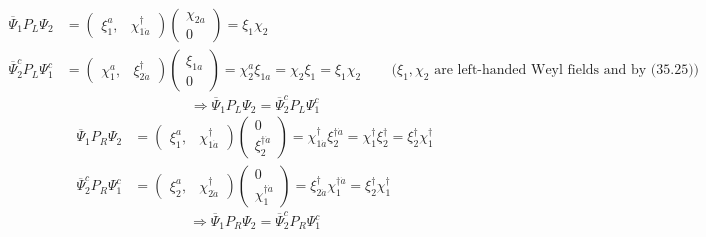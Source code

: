 \documentclass[twoside]{amsart}
\begin{document}
\begin{itemize}
$
\begin{aligned}
  \overline{\Psi}_1 P_L \Psi_2 & = ( \begin{matrix} \xi_1^a , & \chi_{1\dot{a}}^{\dag} \end{matrix} ) \left( \begin{matrix} \chi_{2a} \\ 0 \end{matrix} \right) = \xi_1 \chi_2 \\ 
  \overline{\Psi}_2^c P_L \Psi_1^c & = ( \begin{matrix} \chi_1^a , & \xi_{2\dot{a}}^{\dag} \end{matrix} ) \left( \begin{matrix} \xi_{1a} \\ 0 \end{matrix} \right) = \chi_2^a \xi_{1a} = \chi_2 \xi_1 = \xi_1 \chi_2 \quad \quad \, \text{($\xi_1, \chi_2$ are left-handed Weyl fields and by (35.25))}
\end{aligned}
$
\[
\Longrightarrow \boxed{ \overline{\Psi}_1 P_L \Psi_2 = \overline{\Psi}_2^c P_L \Psi_1^c }
\]
\[
\begin{aligned}
  \overline{\Psi}_1 P_R \Psi_2 & = (\begin{matrix} \xi_1^a, & \chi_{1\dot{a}}^{\dag} \end{matrix} ) \left( \begin{matrix} 0 \\ \xi_2^{\dag \dot{a}} \end{matrix} \right) = \chi^{\dag}_{1\dot{a}} \xi_2^{\dag \dot{a}} = \chi_1^{\dag} \xi_2^{\dag} = \xi^{\dag}_2 \chi_1^{\dag}  \\ 
  \overline{\Psi}_2^c P_R \Psi_1^c & = (\begin{matrix} \xi_2^a, & \chi_{2\dot{a}}^{\dag} \end{matrix} ) \left( \begin{matrix} 0 \\ \chi_1^{\dag \dot{a}} \end{matrix} \right) = \xi^{\dag}_{2\dot{a}} \chi_1^{\dag \dot{a}} = \xi_2^{\dag} \chi_1^{\dag} 
\end{aligned}
\]
\[
\Longrightarrow \boxed{ \overline{\Psi}_1 P_R \Psi_2 = \overline{\Psi}_2^c P_R \Psi_1^c }
\]
\end{itemize}
\end{document}
